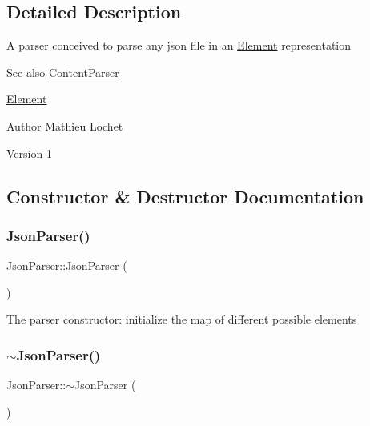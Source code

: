 \subsection{Detailed Description}
A parser conceived to parse any json file in an \mbox{\hyperlink{classElement}{Element}} representation \begin{DoxySeeAlso}{See also}
\mbox{\hyperlink{classContentParser}{Content\+Parser}} 

\mbox{\hyperlink{classElement}{Element}}
\end{DoxySeeAlso}
\begin{DoxyAuthor}{Author}
Mathieu Lochet 
\end{DoxyAuthor}
\begin{DoxyVersion}{Version}
1 
\end{DoxyVersion}


\subsection{Constructor \& Destructor Documentation}
\mbox{\label{classJsonParser_af21abdfb0ceac731e44d897a0285f5d4}} 
\subsubsection{\texorpdfstring{Json\+Parser()}{JsonParser()}}
{\footnotesize\ttfamily Json\+Parser\+::\+Json\+Parser (\begin{DoxyParamCaption}{ }\end{DoxyParamCaption})}

The parser constructor\+: initialize the map of different possible elements \mbox{\label{classJsonParser_a7c0393b54c37f9ff30b6bb59f0ba92ce}} 
\subsubsection{\texorpdfstring{$\sim$\+Json\+Parser()}{~JsonParser()}}
{\footnotesize\ttfamily Json\+Parser\+::$\sim$\+Json\+Parser (\begin{DoxyParamCaption}{ }\end{DoxyParamCaption})\hspace{0.3cm}{\ttfamily [default]}}

